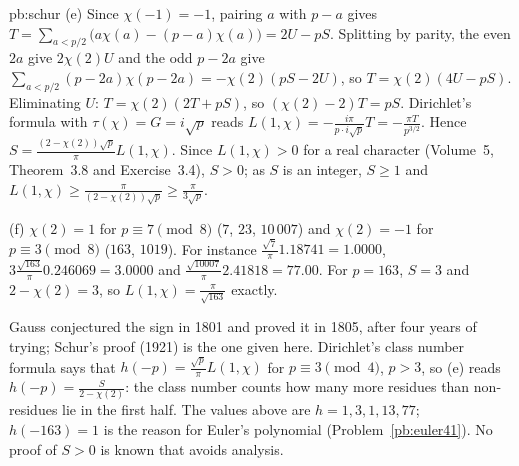 \begin{solution}{pb:schur}
(e) Since $\chi(-1)=-1$, pairing $a$ with $p-a$ gives $T=\sum_{a<p/2}\bigl(a\chi(a)-(p-a)\chi(a)\bigr)=2U-pS$. Splitting by parity, the even $2a$ give $2\chi(2)U$ and the odd
$p-2a$ give $\sum_{a<p/2}(p-2a)\chi(p-2a)=-\chi(2)(pS-2U)$, so $T=\chi(2)(4U-pS)$. Eliminating $U$: $T=\chi(2)(2T+pS)$, so $(\chi(2)-2)T=pS$. Dirichlet's formula with
$\tau(\chi)=G=i\sqrt p$ reads $L(1,\chi)=-\frac{i\pi}{p\cdot i\sqrt p}T=-\frac{\pi T}{p^{3/2}}$. Hence $S=\frac{(2-\chi(2))\sqrt p}\pi L(1,\chi)$. Since $L(1,\chi)>0$ for a real character
(Volume~5, Theorem~3.8 and Exercise~3.4), $S>0$; as $S$ is an integer, $S\ge1$ and $L(1,\chi)\ge\frac\pi{(2-\chi(2))\sqrt p}\ge\frac\pi{3\sqrt p}$.

(f) $\chi(2)=1$ for $p\equiv7\pmod8$ ($7$, $23$, $10\,007$) and $\chi(2)=-1$ for $p\equiv3\pmod8$ ($163$, $1019$). For instance $\frac{\sqrt7}\pi1.18741=1.0000$, $3\frac{\sqrt{163}}\pi0.246069=3.0000$ and
$\frac{\sqrt{10007}}\pi2.41818=77.00$. For $p=163$, $S=3$ and $2-\chi(2)=3$, so $L(1,\chi)=\frac\pi{\sqrt{163}}$ exactly.


\leads Gauss conjectured the sign in 1801 and proved it in 1805, after four years of trying; Schur's proof (1921) is the one given here. Dirichlet's class number formula says that
$h(-p)=\frac{\sqrt p}\pi L(1,\chi)$ for $p\equiv3\pmod4$, $p>3$, so (e) reads $h(-p)=\frac S{2-\chi(2)}$: the class number counts how many more residues than non-residues lie in the first
half. The values above are $h=1,3,1,13,77$; $h(-163)=1$ is the reason for Euler's polynomial (Problem~\ref{pb:euler41}). No proof of $S>0$ is known that avoids analysis.
\end{solution}

